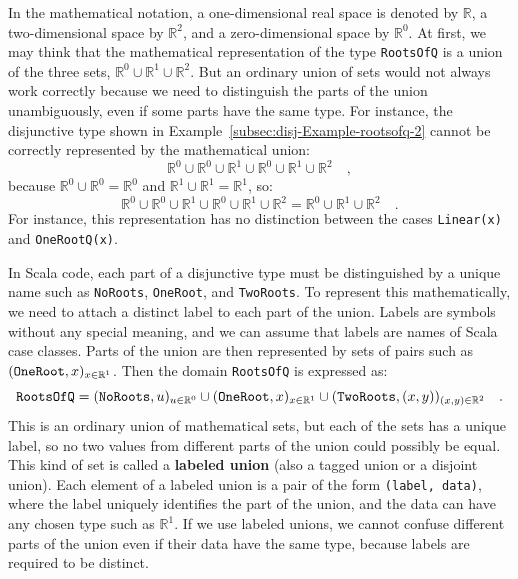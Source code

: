 In the mathematical notation, a one-dimensional real space is denoted
by $\mathbb{R}$, a two-dimensional space by $\mathbb{R}^{2}$, and
a zero-dimensional space by $\mathbb{R}^{0}$. At first, we may think
that the mathematical representation of the type \lstinline!RootsOfQ!
is a union of the three sets, $\mathbb{R}^{0}\cup\mathbb{R}^{1}\cup\mathbb{R}^{2}$.
But an ordinary union of sets would not always work correctly because
we need to distinguish the parts of the union unambiguously, even
if some parts have the same type. For instance, the disjunctive type
shown in Example~\ref{subsec:disj-Example-rootsofq-2} cannot be
correctly represented by the mathematical union:
\[
\mathbb{R}^{0}\cup\mathbb{R}^{0}\cup\mathbb{R}^{1}\cup\mathbb{R}^{0}\cup\mathbb{R}^{1}\cup\mathbb{R}^{2}\quad,
\]
because $\mathbb{R}^{0}\cup\mathbb{R}^{0}=\mathbb{R}^{0}$ and $\mathbb{R}^{1}\cup\mathbb{R}^{1}=\mathbb{R}^{1}$,
so:
\[
\mathbb{R}^{0}\cup\mathbb{R}^{0}\cup\mathbb{R}^{1}\cup\mathbb{R}^{0}\cup\mathbb{R}^{1}\cup\mathbb{R}^{2}=\mathbb{R}^{0}\cup\mathbb{R}^{1}\cup\mathbb{R}^{2}\quad.
\]
For instance, this representation has no distinction between the cases
\lstinline!Linear(x)! and \lstinline!OneRootQ(x)!.

In Scala code, each part of a disjunctive type must be distinguished
by a unique name such as \lstinline!NoRoots!, \lstinline!OneRoot!,
and \lstinline!TwoRoots!. To represent this mathematically, we need
to attach a distinct label to each part of the union. Labels are symbols
without any special meaning, and we can assume that labels are names
of Scala case classes. Parts of the union are then represented by
sets of pairs such as $(\text{\texttt{OneRoot}},x)_{x\in\mathbb{R}^{1}}$.
Then the domain \lstinline!RootsOfQ! is expressed as:
\[
\text{\texttt{RootsOfQ}}=(\text{\texttt{NoRoots}},u)_{u\in\mathbb{R}^{0}}\cup(\text{\texttt{OneRoot}},x)_{x\in\mathbb{R}^{1}}\cup(\text{\texttt{TwoRoots}},\left(x,y\right))_{\left(x,y\right)\in\mathbb{R}^{2}}\quad.
\]
This is an ordinary union of mathematical sets, but each of the sets
has a unique label, so no two values from different parts of the union
could possibly be equal. This kind of set is called a \textbf{labeled
union} (also a tagged union or a disjoint union).
Each element of a labeled union is a pair of the form \lstinline!(label, data)!,
where the label uniquely identifies the part of the union, and the
data can have any chosen type such as $\mathbb{R}^{1}$. If we use
labeled unions, we cannot confuse different parts of the union even
if their data have the same type, because labels are required to be
distinct.

